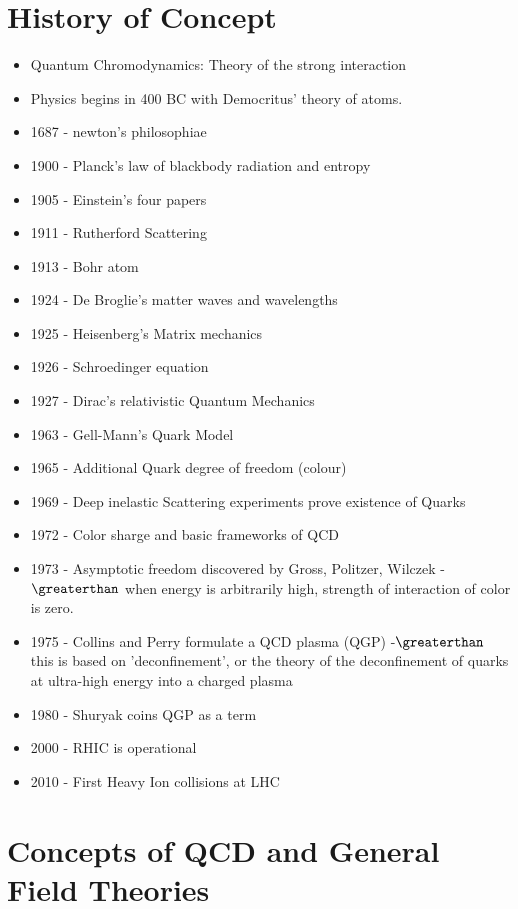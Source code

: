 \documentclass{article}
\begin{document}
\section{History of Concept}
\begin{itemize}
        \item Quantum Chromodynamics: Theory of the strong interaction
        \item Physics begins in 400 BC with Democritus' theory of atoms.
        \item 1687 - newton's philosophiae
        \item 1900 - Planck's law of blackbody radiation and entropy
        \item 1905 - Einstein's four papers
        \item 1911 - Rutherford Scattering
        \item 1913 - Bohr atom
        \item 1924 - De Broglie's matter waves and wavelengths
        \item 1925 - Heisenberg's Matrix mechanics
        \item 1926 - Schroedinger equation
        \item 1927 - Dirac's relativistic Quantum Mechanics
        \item 1963 - Gell-Mann's Quark Model
        \item 1965 - Additional Quark degree of freedom (colour)
        \item 1969 - Deep inelastic Scattering experiments prove existence of Quarks
        \item 1972 - Color sharge and basic frameworks of QCD
        \item 1973 - Asymptotic freedom discovered by Gross, Politzer, Wilczek -\(\greaterthan\) when energy is arbitrarily high,
             strength of interaction of color is zero.
        \item 1975 - Collins and Perry formulate a QCD plasma (QGP) -\(\greaterthan\) this is based on 'deconfinement', or the theory of
             the deconfinement of quarks at ultra-high energy into a charged plasma
        \item 1980 - Shuryak coins QGP as a term
        \item 2000 - RHIC is operational
        \item 2010 - First Heavy Ion collisions at LHC
\end{itemize}

\section{Concepts of QCD and General Field Theories}
\end{document}
